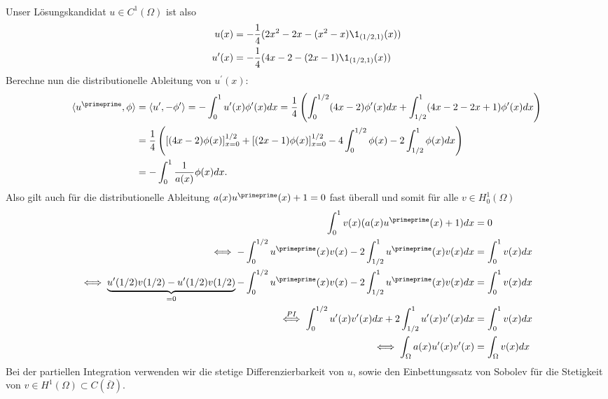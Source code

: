 \begin{solution}
\begin{align*}
\end{align*}
Unser Lösungskandidat $u \in C^1(\Omega)$ ist also
\begin{align*}
  u(x) &= -\frac{1}{4}(2x^2-2x- (x^2-x)\1_{(1/2,1)}(x)) \\
  u^{\prime}(x) &= -\frac{1}{4}(4x -2 - (2x-1)\1_{(1/2,1)}(x))
\end{align*}
Berechne nun die distributionelle Ableitung von $u^{\prime}(x)$:
\begin{align*}
  \langle u^{\primeprime}, \phi \rangle &= \langle u^{\prime}, -\phi^{\prime}\rangle
  = -\int_0^1 u^{\prime}(x)\phi^{\prime}(x) dx = \frac{1}{4}\left(\int_0^{1/2}(4x-2)\phi^{\prime}(x) dx +
  \int_{1/2}^1(4x-2-2x+1)\phi^{\prime}(x) dx\right) \\
  &= \frac{1}{4}\left([(4x-2)\phi(x)]_{x=0}^{1/2} + [(2x-1)\phi(x)]_{x=0}^{1/2} -
  4\int_0^{1/2}\phi(x) - 2\int_{1/2}^1\phi(x)dx\right) \\
  &= -\int_0^1 \frac{1}{a(x)}\phi(x) dx.
\end{align*}
Also gilt auch für die distributionelle Ableitung $a(x)u^{\primeprime}(x) + 1 = 0$
fast überall und somit für alle $v \in H_0^1(\Omega)$
\begin{align*}
  \int_0^1 v(x)(a(x)u^{\primeprime}(x) + 1) dx &= 0 \\
  \iff - \int_0^{1/2}u^{\primeprime}(x)v(x) -2\int_{1/2}^1 u^{\primeprime}(x)v(x) dx
  &= \int_0^1 v(x) dx \\
   \iff \underbrace{u^{\prime}(1/2)v(1/2) - u^{\prime}(1/2)v(1/2)}_{=0} - \int_0^{1/2}u^{\primeprime}(x)v(x)
  -2 \int_{1/2}^1 u^{\primeprime}(x)v(x) dx  &=
  \int_0^1 v(x) dx \\
  \stackrel{PI}{\iff} \int_0^{1/2} u^{\prime}(x)v^{\prime}(x)dx +
  2\int_{1/2}^1 u^{\prime}(x)v^{\prime}(x) dx &= \int_0^1 v(x) dx \\
  \iff \int_\Omega a(x)u^{\prime}(x)v^{\prime}(x) &= \int_\Omega v(x) dx
\end{align*}
Bei der partiellen Integration verwenden wir die stetige Differenzierbarkeit von $u$,
sowie den Einbettungssatz von Sobolev für die Stetigkeit von
$v \in H^1(\Omega) \subset C(\overline{\Omega})$.
\end{solution}

